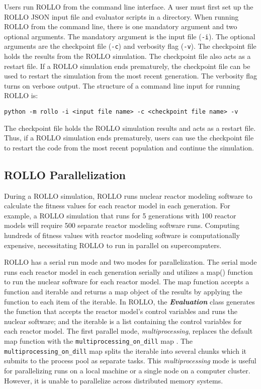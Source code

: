 Users run \gls{ROLLO} from the command line interface. 
A user must first set up the \gls{ROLLO} JSON input file and evaluator 
scripts in a directory. 
When running \gls{ROLLO} from the command line, there is one mandatory argument and 
two optional arguments. 
The mandatory argument is the input file (\texttt{-i}). 
The optional arguments are the checkpoint file (\texttt{-c}) and verbosity 
flag (\texttt{-v}).  
The checkpoint file holds the results from the \gls{ROLLO} simulation. 
The checkpoint file also acts as a restart file. 
If a ROLLO simulation ends prematurely, the checkpoint file can be used to restart 
the simulation from the most recent generation.
The verbosity flag turns on verbose output. 
The structure of a command line input for running \gls{ROLLO} is: 

\noindent
\texttt{python -m rollo -i <input file name> -c <checkpoint file name> -v}

The checkpoint file holds the \gls{ROLLO} simulation results and acts as a restart file.
Thus, if a \gls{ROLLO} simulation ends prematurely, users can use the checkpoint file to 
restart the code from the most recent population and continue the simulation. 

\subsection{ROLLO Parallelization}
\label{sec:rollo_parallel}
During a \gls{ROLLO} simulation, \gls{ROLLO} runs nuclear reactor modeling software to 
calculate the fitness values for each reactor model in each generation. 
For example, a \gls{ROLLO} simulation that runs for 5 generations with 100 reactor models 
will require 500 separate reactor modeling software runs. 
Computing hundreds of fitness values with reactor modeling software is computationally 
expensive, necessitating \gls{ROLLO} to run in parallel on supercomputers. 

\gls{ROLLO} has a serial run mode and two modes for parallelization. 
The serial mode runs each reactor model in each generation serially and utilizes a 
map() function to run the nuclear software for each reactor model.
The map function accepts a function and iterable and returns a map object of the results 
by applying the function to each item of the iterable. 
In \gls{ROLLO}, the \textbf{\textit{Evaluation}} class generates the function 
that accepts the reactor model's control variables and runs the nuclear software;
and the iterable is a list containing the control variables for each reactor model. 
The first parallel mode, \textit{multiprocessing}, replaces the default map function 
with the \texttt{multiprocessing\_on\_dill} map \cite{smallshire_multiprocessing_on_dill_nodate}.
The \texttt{multiprocessing\_on\_dill} map splits the iterable into several chunks 
which it submits to the process pool as separate tasks.
This \textit{multiprocessing} mode is useful for parallelizing runs on a local machine or 
a single node on a computer cluster. 
However, it is unable to parallelize across distributed memory systems.

